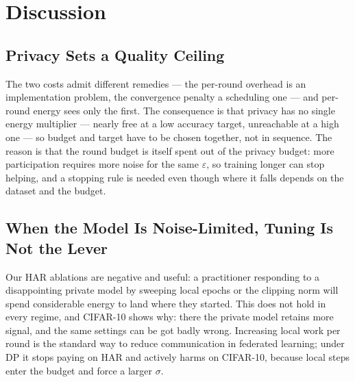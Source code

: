 
\section{Discussion}



\subsection{Privacy Sets a Quality Ceiling}

The two costs admit different remedies --- the per-round overhead is an
implementation problem, the convergence penalty a scheduling one --- and
per-round energy sees only the first. The consequence is that privacy has no
single energy multiplier --- nearly free at a low accuracy target, unreachable
at a high one --- so budget and target have to be chosen together, not in
sequence. The reason is that the round budget
is itself spent out of the privacy budget: more participation requires more
noise for the same $\varepsilon$, so training longer can stop helping, and a
stopping rule is needed even though where it falls depends on the dataset and
the budget.

\subsection{When the Model Is Noise-Limited, Tuning Is Not the Lever}

Our HAR ablations are negative and useful: a practitioner responding to a
disappointing private model by sweeping local epochs or the clipping norm will
spend considerable energy to land where they started. This does not hold in every regime, and CIFAR-10 shows why: there the
private model retains more signal, and the same settings can be got badly
wrong. Increasing local work per round is the standard way to reduce
communication in federated learning; under DP it stops paying on HAR and
actively harms on CIFAR-10, because local steps enter the budget and force a
larger $\sigma$.

